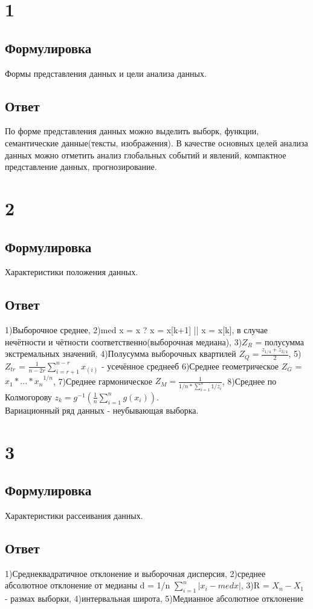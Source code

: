 \documentclass[a4]{article}
\begin{document}
\tableofcontents
\newpage

	\section{1}
	\subsection*{Формулировка}
	Формы представления данных и цели анализа данных.
	\subsection*{Ответ}
	По форме представления данных можно выделить выборк, функции, семантические данные(тексты, изображения). В качестве основных целей анализа данных можно отметить анализ глобальных событий и явлений, компактное представление данных, прогнозирование.
	
	\section{2}
	\subsection*{Формулировка}
	Характеристики положения данных.
	\subsection*{Ответ}
	1)Выборочное среднее, 2)med x = x ? x = x[k+1] || x = x[k], в случае нечётности и чётности соответственно(выборочная медиана), 3)$Z_R$ = полусумма экстремальных значений, 4)Полусумма выборочных квартилей $Z_Q = \frac{z_{1/4} + z_{3/4}}{2}$, 5)$Z_{tr}$ = $\frac{1}{n - 2r} \sum_{i = r+1}^{n-r} x_{(i)}$ - усечённое среднееб 6)Среднее геометрическое $Z_G$ = ${x_1 *...* x_n}^{1/n}$, 7)Среднее гармоническое $Z_M = \frac{1}{1/n * \sum_{i = 1}^{n}1/z_i}$, 8)Среднее по Колмогорову $z_k = g^{-1} (\frac{1}{n} \sum_{i = 1}^n g(x_i))$.\\
	Вариационный ряд данных - неубывающая выборка.
	
	\section{3}
	\subsection*{Формулировка}
	Характеристики рассеивания данных.
	\subsection*{Ответ}
	1)Среднеквадратичное отклонение и выборочная дисперсия, 2)среднее абсолютное отклонение от медианы d = 1/n $\sum_{i =1}^{n} |x_i - med x|$, 3)R = $X_n - X_1$ - размах выборки, 4)интервальная широта, 5)Медианное абсолютное отклонение
	
\end{document}
